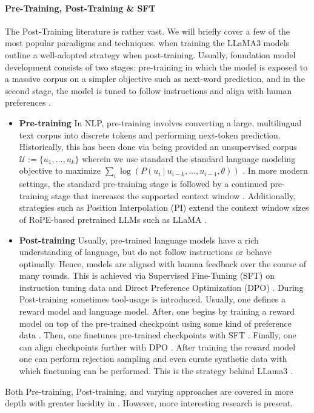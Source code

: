 \documentclass[10pt]{article}
\begin{document}
\paragraph{Pre-Training, Post-Training \& SFT} 
The Post-Training literature is rather vast. We will briefly cover a few of the most popular paradigms and techniques. \citet{grattafiori2024llama} when training the LLaMA3 models outline a well-adopted strategy when post-training. Usually, foundation model development consists of two stages: pre-training in which the model is exposed to a massive corpus on a simpler objective such as next-word prediction, and in the second stage, the model is tuned to follow instructions and align with human preferences \citep{grattafiori2024llama}.
\begin{itemize}
    \item \textbf{Pre-training} In NLP, pre-training involves converting a large, multilingual text corpus into discrete tokens and performing next-token prediction. Historically, this has been done via being provided an unsupervised corpus $\mathcal{U} := \{u_1, \ldots, u_k\}$ wherein we use standard the standard language modeling objective to maximize $\sum_i \log(P(u_i ~|~ u_{i-k}, \ldots, u_{i-1}, \theta))$ \citep{radford2018improving}. In more modern settings, the standard pre-training stage is followed by a continued pre-training stage that increases the supported context window \citep{grattafiori2024llama}. Additionally, strategies such as Position Interpolation (PI) extend the context window sizes of RoPE-based pretrained LLMs such as LLaMA \citep{chen2023extending}.
    \item \textbf{Post-training} Usually, pre-trained language models have a rich understanding of language, but do not follow instructions or behave optimally. Hence, models are aligned with humna feedback over the course of many rounds. This is achieved via Supervised Fine-Tuning (SFT) on instruction tuning data and Direct Preference Optimization (DPO) \citep{grattafiori2024llama, rafailov2023direct}. During Post-training sometimes tool-usage is introduced. Usually, one defines a reward model and language model. 
    After, one begins by training a reward model on top of the pre-trained checkpoint using some kind of preference data \citep{grattafiori2024llama}. Then, one finetunes pre-trained checkpoints with SFT \citep{grattafiori2024llama}. Finally, one can align checkpoints further with DPO \citep{grattafiori2024llama}. After training the reward model one can perform rejection sampling and even curate synthetic data with which finetuning can be performed. This is the strategy behind LLama3 \citep{grattafiori2024llama}.
\end{itemize}
Both Pre-training, Post-training, and varying approaches are covered in more depth with greater lucidity in \citet{Guo_2025}. However, more interesting research is present.
\end{document}

